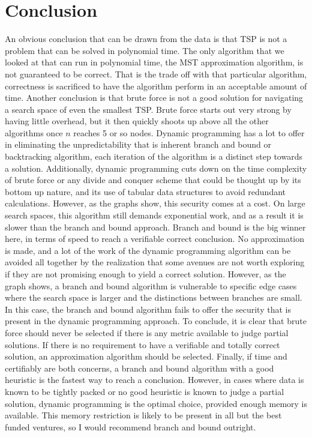 \documentclass[a4paper,12pt]{article}
\begin{document}
\section{Conclusion}
An obvious conclusion that can be drawn from the data is that TSP is not a problem that can be solved in polynomial time. The only algorithm that we looked at that can run in polynomial time, the MST approximation algorithm, is not guaranteed to be correct. That is the trade off with that particular algorithm, correctness is sacrificed to have the algorithm perform in an acceptable amount of time. Another conclusion is that brute force is not a good solution for navigating a search space of even the smallest TSP. Brute force starts out very strong by having little overhead, but it then quickly shoots up above all the other algorithms once $n$ reaches 5 or so nodes. Dynamic programming has a lot to offer in eliminating the unpredictability that is inherent branch and bound or backtracking algorithm, each iteration of the algorithm is a distinct step towards a solution. Additionally, dynamic programming cuts down on the time complexity of brute force or any divide and conquer scheme that could be thought up by its bottom up nature, and its use of tabular data structures to avoid redundant calculations. However, as the graphs show, this security comes at a cost. On large search spaces, this algorithm still demands exponential work, and as a result it is slower than the branch and bound approach. Branch and bound is the big winner here, in terms of speed to reach a verifiable correct conclusion. No approximation is made, and a lot of the work of the dynamic programming algorithm can be avoided all together by the realization that some avenues are not worth exploring if they are not promising enough to yield a correct solution. However, as the graph shows, a branch and bound algorithm is vulnerable to specific edge cases where the search space is larger and the distinctions between branches are small. In this case, the branch and bound algorithm fails to offer the security that is present in the dynamic programming approach. To conclude, it is clear that brute force should never be selected if there is any metric available to judge partial solutions. If there is no requirement to have a verifiable and totally correct solution, an approximation algorithm should be selected. Finally, if time and certifiably are both concerns, a branch and bound algorithm with a good heuristic is the fastest way to reach a conclusion. However, in cases where data is known to be tightly packed or no good heuristic is known to judge a partial solution, dynamic programming is the optimal choice, provided enough memory is available. This memory restriction is likely to be present in all but the best funded ventures, so I would recommend branch and bound outright.
\end{document}
